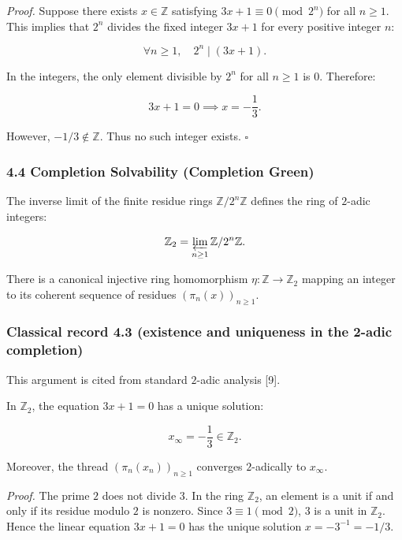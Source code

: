 \documentclass[
  11pt,
]{article}
\theoremstyle{plain}
\theoremstyle{definition}\newtheorem{definition}[theorem]{Definition}
\theoremstyle{remark}\newtheorem*{remark}{Remark}
\begin{document}
\emph{Proof.} Suppose there exists \(x \in \mathbb{Z}\) satisfying
\(3x + 1 \equiv 0 \pmod{2^n}\) for all \(n \ge 1\). This implies that
\(2^n\) divides the fixed integer \(3x + 1\) for every positive integer
\(n\):

\[
\forall n \ge 1, \quad 2^n \mid (3x + 1).
\]

In the integers, the only element divisible by \(2^n\) for all
\(n \ge 1\) is \(0\). Therefore:

\[
3x + 1 = 0 \implies x = -\frac{1}{3}.
\]

However, \(-1/3 \notin \mathbb{Z}\). Thus no such integer exists.
\(\square\)

\subsubsection{4.4 Completion Solvability (Completion
Green)}\label{completion-solvability-completion-green}

The inverse limit of the finite residue rings
\(\mathbb{Z}/2^n\mathbb{Z}\) defines the ring of \(2\)-adic integers:

\[
\mathbb{Z}_2 = \varprojlim_{n \ge 1} \mathbb{Z}/2^n\mathbb{Z}.
\]

There is a canonical injective ring homomorphism
\(\eta: \mathbb{Z} \to \mathbb{Z}_2\) mapping an integer to its coherent
sequence of residues \((\pi_n(x))_{n \ge 1}\).

\subsubsection{Classical record 4.3 (existence and uniqueness in the
2-adic
completion)}\label{classical-record-4.3-existence-and-uniqueness-in-the-2-adic-completion}

This argument is cited from standard \(2\)-adic analysis {[}9{]}.

In \(\mathbb{Z}_2\), the equation \(3x + 1 = 0\) has a unique solution:

\[
x_\infty = -\frac{1}{3} \in \mathbb{Z}_2.
\]

Moreover, the thread \((\pi_n(x_n))_{n \ge 1}\) converges \(2\)-adically
to \(x_\infty\).

\emph{Proof.} The prime \(2\) does not divide \(3\). In the ring
\(\mathbb{Z}_2\), an element is a unit if and only if its residue modulo
\(2\) is nonzero. Since \(3 \equiv 1 \pmod 2\), \(3\) is a unit in
\(\mathbb{Z}_2\). Hence the linear equation \(3x + 1 = 0\) has the
unique solution \(x = -3^{-1} = -1/3\).
\end{document}
